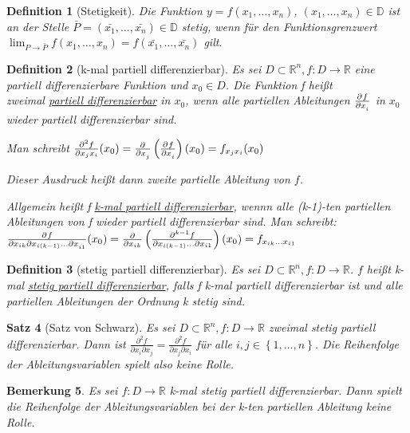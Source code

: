 \documentclass[fontset=ubuntu,11pt,a4paper,fleqn,headsepline]{scrreprt}
\newtheorem{defi}{Definition}[section]
\newtheorem{bemerkung}[defi]{Bemerkung}
\newtheorem{satz}[defi]{Satz}
\begin{document}
\begin{multicols}{2}
    \begin{defi}[Stetigkeit]
        Die Funktion \(y=f(x_1,\dots,x_n)\), \((x_1,\dots,x_n)\in\mathbb{D}\) ist an der Stelle \(\bar{P}=(\bar{x_1},\dots,\bar{x_n}) \in \mathbb{D}\) stetig, wenn für den Funktionsgrenzwert \(\lim_{P\to\bar{P}}{f(x_1,\dots,x_n)} = f(\bar{x_1},\dots,\bar{x_n})\) gilt.
    \end{defi}
    
    \begin{defi}[k-mal partiell differenzierbar]
        Es sei \(D\subset\mathbb{R}^n,f:D\to\mathbb{R}\) eine partiell differenzierbare Funktion und \(x_0 \in D\). Die Funktion f heißt \\ zweimal \underline{partiell differenzierbar} in \(x_0\), wenn alle partiellen Ableitungen \(\pd{f}{x_i}\) in \(x_0\) wieder partiell differenzierbar sind.
    
        Man schreibt \(\frac{\partial^2 f}{\partial x_j x_i}(x_0)=\pd{}{x_j}\left(\pd{f}{x_i}\right)(x_0)=f_{x_j x_i}(x_0)\)
    
        Dieser Ausdruck heißt dann zweite partielle Ableitung von $f$.
    
        Allgemein heißt f \underline{k-mal partiell differenzierbar}, wennn alle (k-1)-ten partiellen Ableitungen von f wieder partiell differenzierbar sind. Man schreibt:
            \(\pd{f}{x_{ik} \partial x_{i(k-1)} \dots \partial x_{i1}}(x_0) = \frac{\partial}{\partial x_{ik}}\left(\frac{\partial^{k-1} f}{\partial x_{i(k-1)} \dots \partial x_{i1}}\right)(x_0) = f_{x_{ik} \dots x_{i1}}\)
    \end{defi}
    
    \begin{defi}[stetig partiell differenzierbar]
        Es sei \(D\subset\mathbb{R}^n,f:D\to\mathbb{R}\). \(f\) heißt k-mal \underline{stetig partiell differenzierbar}, falls f k-mal partiell differenzierbar ist und alle partiellen Ableitungen der Ordnung k stetig sind.
    \end{defi}
    
    \begin{satz}[Satz von Schwarz]
        Es sei \(D\subset\mathbb{R}^n,f:D\to\mathbb{R}\) zweimal stetig partiell differenzierbar. Dann ist \(\frac{\partial^2 f}{\partial x_i \partial x_j}=\frac{\partial^2 f}{\partial x_j \partial x_i}\) für alle \(i,j\in\left\{1,\dots,n\right\}\). Die Reihenfolge der Ableitungsvariablen spielt also keine Rolle.
    \end{satz}
    
    \begin{bemerkung}
        Es sei \(f:D\to\mathbb{R}\) k-mal stetig partiell differenzierbar. Dann spielt die Reihenfolge der Ableitungsvariablen bei der k-ten partiellen Ableitung keine Rolle.
    \end{bemerkung}
    

\end{multicols}
\end{document}
